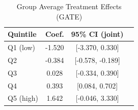 \begin{table}[h]
\centering
\caption{Group Average Treatment Effects (GATE)}
\label{tab:gate}
\begin{tabular}{lccc}
\toprule
Quintile & Coef. & 95\% CI (joint) \\
\midrule
Q1 (low) & -1.520 & [-3.370, 0.330] \\
Q2 & -0.384 & [-0.578, -0.189] \\
Q3 & 0.028 & [-0.334, 0.390] \\
Q4 & 0.393 & [0.084, 0.702] \\
Q5 (high) & 1.642 & [-0.046, 3.330] \\
\bottomrule
\end{tabular}
\end{table}